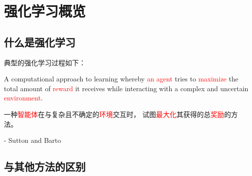 ﻿\section{强化学习概览}

\subsection{什么是强化学习}

\indent 典型的强化学习过程如下：



\begin{definitionbox}[强化学习]
A computational approach to learning whereby \textcolor{red}{an agent} tries
to \textcolor{red}{maximize} the total amount of \textcolor{red}{reward} it receives while
interacting with a complex and uncertain \textcolor{red}{environment}.

一种\textcolor{red}{智能体}在与复杂且不确定的\textcolor{red}{环境}交互时，
试图\textcolor{red}{最大化}其获得的总\textcolor{red}{奖励}的方法。

\hfill - Sutton and Barto
\end{definitionbox}

\subsection{与其他方法的区别}

